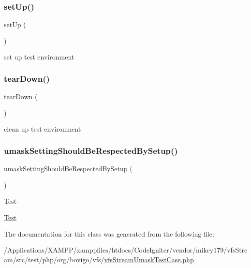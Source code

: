 \subsubsection{\texorpdfstring{set\+Up()}{setUp()}}
{\footnotesize\ttfamily set\+Up (\begin{DoxyParamCaption}{ }\end{DoxyParamCaption})}

set up test environment \mbox{\label{classorg_1_1bovigo_1_1vfs_1_1vfs_stream_umask_test_case_a80fe3d17e658907fc75346a0ec9d6fc7}} 
\subsubsection{\texorpdfstring{tear\+Down()}{tearDown()}}
{\footnotesize\ttfamily tear\+Down (\begin{DoxyParamCaption}{ }\end{DoxyParamCaption})}

clean up test environment \mbox{\label{classorg_1_1bovigo_1_1vfs_1_1vfs_stream_umask_test_case_aedd4000bce8a9dc643b50bf656602780}} 
\subsubsection{\texorpdfstring{umask\+Setting\+Should\+Be\+Respected\+By\+Setup()}{umaskSettingShouldBeRespectedBySetup()}}
{\footnotesize\ttfamily umask\+Setting\+Should\+Be\+Respected\+By\+Setup (\begin{DoxyParamCaption}{ }\end{DoxyParamCaption})}

\begin{DoxyRefDesc}{Test}
\item[\mbox{\hyperlink{test__test000129}{Test}}]\end{DoxyRefDesc}


The documentation for this class was generated from the following file\+:\begin{DoxyCompactItemize}
\item 
/\+Applications/\+X\+A\+M\+P\+P/xamppfiles/htdocs/\+Code\+Igniter/vendor/mikey179/vfs\+Stream/src/test/php/org/bovigo/vfs/\mbox{\hyperlink{vfs_stream_umask_test_case_8php}{vfs\+Stream\+Umask\+Test\+Case.\+php}}\end{DoxyCompactItemize}
